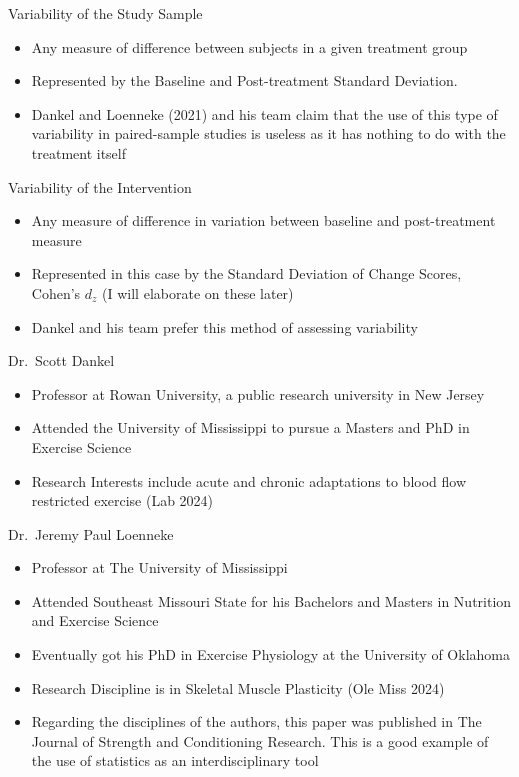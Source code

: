 \documentclass[
  ignorenonframetext,
  aspectratio=169,
]{beamer}
\providecommand{\tightlist}{%
  \setlength{\itemsep}{0pt}\setlength{\parskip}{0pt}}
\begin{document}
\begin{frame}{Variability of the Study Sample}
\protect\hypertarget{variability-of-the-study-sample}{}
\begin{itemize}
\tightlist
\item
  Any measure of difference between subjects in a given treatment group
\item
  Represented by the Baseline and Post-treatment Standard Deviation.
\item
  Dankel and Loenneke (2021) and his team claim that the use of this
  type of variability in paired-sample studies is useless as it has
  nothing to do with the treatment itself
\end{itemize}
\end{frame}

\begin{frame}{Variability of the Intervention}
\protect\hypertarget{variability-of-the-intervention}{}
\begin{itemize}
\tightlist
\item
  Any measure of difference in variation between baseline and
  post-treatment measure
\item
  Represented in this case by the Standard Deviation of Change Scores,
  Cohen's \(d_z\) (I will elaborate on these later)
\item
  Dankel and his team prefer this method of assessing variability
\end{itemize}
\end{frame}

\begin{frame}{Dr.~Scott Dankel}
\protect\hypertarget{dr.-scott-dankel}{}
\begin{itemize}
\tightlist
\item
  Professor at Rowan University, a public research university in New
  Jersey
\item
  Attended the University of Mississippi to pursue a Masters and PhD in
  Exercise Science
\item
  Research Interests include acute and chronic adaptations to blood flow
  restricted exercise (Lab 2024)
\end{itemize}
\end{frame}

\begin{frame}{Dr.~Jeremy Paul Loenneke}
\protect\hypertarget{dr.-jeremy-paul-loenneke}{}
\begin{itemize}
\item
  Professor at The University of Mississippi
\item
  Attended Southeast Missouri State for his Bachelors and Masters in
  Nutrition and Exercise Science
\item
  Eventually got his PhD in Exercise Physiology at the University of
  Oklahoma
\item
  Research Discipline is in Skeletal Muscle Plasticity (Ole Miss 2024)
\item
  Regarding the disciplines of the authors, this paper was published in
  The Journal of Strength and Conditioning Research. This is a good
  example of the use of statistics as an interdisciplinary tool
\end{itemize}
\end{frame}
\end{document}
